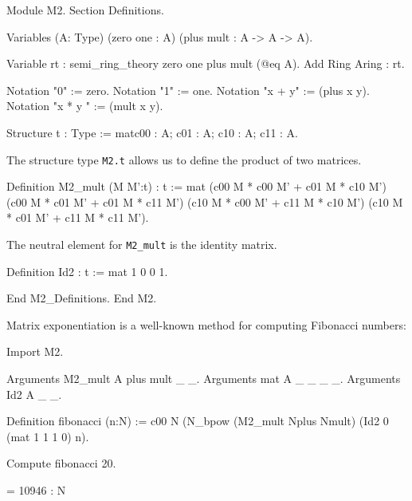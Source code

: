 \begin{Coqsrc}
Module M2.
Section Definitions.
  
  Variables (A: Type) (zero one : A)  (plus mult  : A -> A -> A).
  
  Variable rt : semi_ring_theory  zero one plus mult   (@eq A).
  Add Ring Aring : rt.

  Notation "0" := zero.  
  Notation "1" := one.
  Notation "x + y" := (plus x y).  
  Notation "x * y " := (mult x y).
  
  Structure t : Type := mat{c00 : A;  c01 : A;  c10 : A;  c11 : A}.
\end{Coqsrc}


The structure type \texttt{M2.t} allows us to define the product
of two matrices. 


\begin{Coqsrc}
Definition M2_mult (M M':t) : t := mat
  (c00 M * c00 M' + c01 M * c10 M') (c00 M * c01 M' + c01 M * c11 M')
  (c10 M * c00 M' + c11 M * c10 M') (c10 M * c01 M' + c11 M * c11 M').
\end{Coqsrc}

The neutral element for \texttt{M2\_mult} is the identity matrix.

\begin{Coqsrc}
Definition Id2 : t := mat 1 0 0 1.

End M2_Definitions.
End M2.
\end{Coqsrc}

Matrix exponentiation is a well-known method for computing Fibonacci numbers:


\begin{Coqsrc}

Import M2.

Arguments M2_mult {A} plus mult  _  _.
Arguments mat {A} _ _ _ _.
Arguments Id2 {A}  _ _.

Definition fibonacci (n:N) :=
 c00 N  (N_bpow  (M2_mult Nplus Nmult) 
                 (Id2  0%
                 (mat  1 1 1 0)%
                 n).

Compute fibonacci 20.
\end{Coqsrc}

\begin{Coqanswer}
= 10946%
     : N  
\end{Coqanswer}

